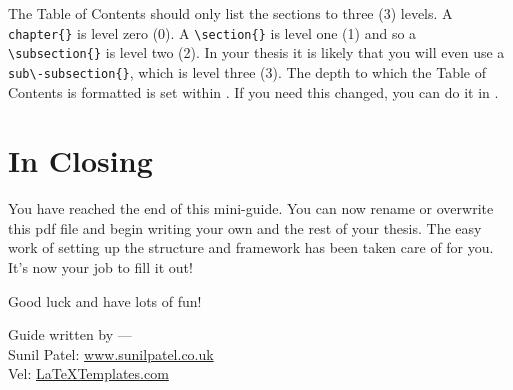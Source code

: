 The Table of Con\-tents should only list the sec\-tions to three (3) levels. A
\verb|chapter{}| is level zero (0). A \verb|\section{}| is level one (1) and so
a \verb|\subsection{}| is level two (2). In your thesis it is likely that you
will even use a \verb|sub\-subsection{}|, which is level three (3). The depth to
which the Table of Con\-tents is formatted is set within
. If you need this chang\-ed, you can do it in
.


\section{In Closing}

You have reached the end of this mini-guide. You can now rename or overwrite
this pdf file and begin writing your own  and the rest of
your thesis. The easy work of setting up the structure and framework has been
taken care of for you. It's now your job to fill it out!

Good luck and have lots of fun!

\begin{flushright}
Guide written by ---\\
Sunil Patel: \href{http://www.sunilpatel.co.uk}{www.sunilpatel.co.uk}\\
Vel: \href{http://www.LaTeXTemplates.com}{LaTeXTemplates.com}
\end{flushright}
